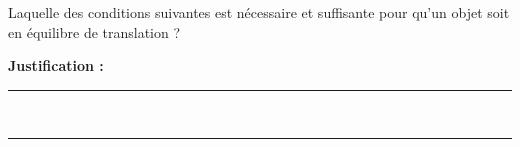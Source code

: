 Laquelle des conditions suivantes est nécessaire et suffisante pour qu'un objet soit en équilibre de translation ?

\choices

\noindent\textbf{Justification :} \hrulefill \\[2.5ex]
\rule{\linewidth}{0.4pt} \\[2.5ex]
\rule{\linewidth}{0.4pt}
\vfill
